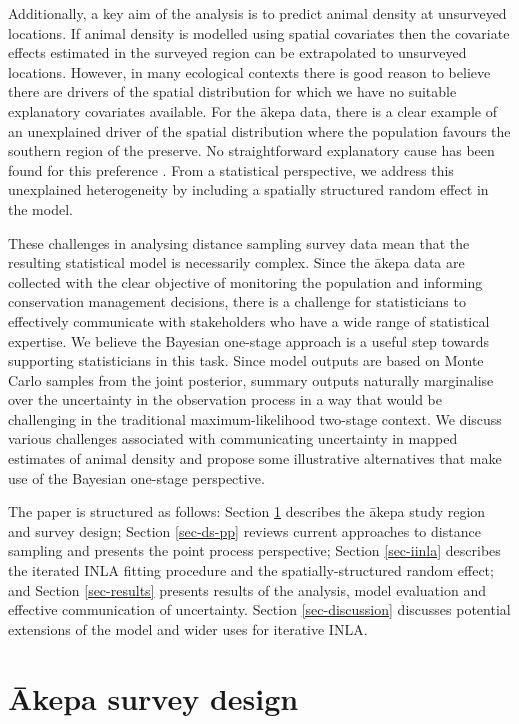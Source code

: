 \documentclass{statsoc}
\newcommand{\akepa}{\textquotesingle\={a}kepa}  %
\newcommand{\Akepa}{\textquotesingle\={A}kepa}  %
\begin{document}
Additionally, a key aim of the analysis is to predict animal density at unsurveyed locations.  If animal density is modelled using spatial covariates then the covariate effects estimated in the surveyed region can be extrapolated to unsurveyed locations.  However, in many ecological contexts there is good reason to believe there are drivers of the spatial distribution for which we have no suitable explanatory covariates available. For the \akepa{} data, there is a clear example of an unexplained driver of the spatial distribution where the population favours the southern region of the preserve.  No straightforward explanatory cause has been found for this preference \citep{camp_dsm_2020}.  From a statistical perspective, we address this unexplained heterogeneity by including a spatially structured random effect in the model.

These challenges in analysing distance sampling survey data mean that the resulting statistical model is necessarily complex. Since the \akepa{} data are collected with the clear objective of monitoring the population and informing conservation management decisions, there is a challenge for statisticians to effectively communicate with stakeholders who have a wide range of statistical expertise. We believe the Bayesian one-stage approach is a useful step towards supporting statisticians in this task.  Since model outputs are based on Monte Carlo samples from the joint posterior, summary outputs naturally marginalise over the uncertainty in the observation process in a way that would be challenging in the traditional maximum-likelihood two-stage context.  We discuss various challenges associated with communicating uncertainty in mapped estimates of animal density and propose some illustrative alternatives that make use of the Bayesian one-stage perspective.

The paper is structured as follows:  Section \ref{sec-study-design} describes the \akepa{} study region and survey design; Section \ref{sec-ds-pp} reviews current approaches to distance sampling and presents the point process perspective; Section \ref{sec-iinla} describes the iterated INLA fitting procedure and the spatially-structured random effect; and Section \ref{sec-results} presents results of the analysis, model evaluation and effective communication of uncertainty.  Section \ref{sec-discussion} discusses potential extensions of the model and wider uses for iterative INLA.

\section{\Akepa{} survey design}
\label{sec-study-design}
\end{document}
